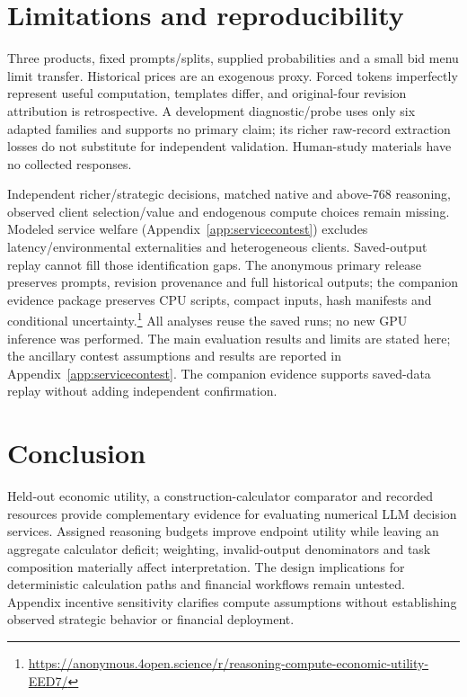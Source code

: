 \documentclass[sigconf,anonymous,nonacm]{acmart}
\begin{document}
\section{Limitations and reproducibility}\label{sec:limitations}
Three products, fixed prompts/splits, supplied probabilities and a small bid menu limit transfer. Historical prices are an exogenous proxy. Forced tokens imperfectly represent useful computation, templates differ, and original-four revision attribution is retrospective. A development diagnostic/probe uses only six adapted families and supports no primary claim; its richer raw-record extraction losses do not substitute for independent validation. Human-study materials have no collected responses.

Independent richer/strategic decisions, matched native and above-768 reasoning, observed client selection/value and endogenous compute choices remain missing. Modeled service welfare (Appendix~\ref{app:servicecontest}) excludes latency/environmental externalities and heterogeneous clients. Saved-output replay cannot fill those identification gaps. The anonymous primary release preserves prompts, revision provenance and full historical outputs; the companion evidence package preserves CPU scripts, compact inputs, hash manifests and conditional uncertainty.\footnote{\url{https://anonymous.4open.science/r/reasoning-compute-economic-utility-EED7/}} All analyses reuse the saved runs; no new GPU inference was performed. The main evaluation results and limits are stated here; the ancillary contest assumptions and results are reported in Appendix~\ref{app:servicecontest}. The companion evidence supports saved-data replay without adding independent confirmation.
\section{Conclusion}
Held-out economic utility, a construction-calculator comparator and recorded resources provide complementary evidence for evaluating numerical LLM decision services. Assigned reasoning budgets improve endpoint utility while leaving an aggregate calculator deficit; weighting, invalid-output denominators and task composition materially affect interpretation. The design implications for deterministic calculation paths and financial workflows remain untested. Appendix incentive sensitivity clarifies compute assumptions without establishing observed strategic behavior or financial deployment.
\FloatBarrier


\clearpage
\appendix
\end{document}
